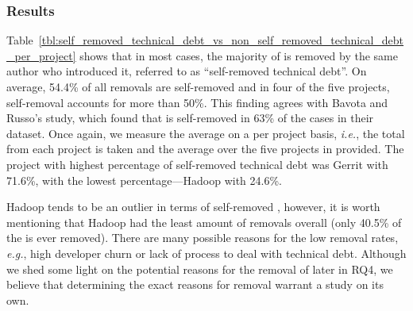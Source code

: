 \subsubsection*{Results} Table~\ref{tbl:self_removed_technical_debt_vs_non_self_removed_technical_debt_per_project} shows that in most cases, the majority of \SATD is removed by the same author who introduced it, referred to as ``self-removed technical debt''. On average, 54.4\% of all removals are self-removed and in four of the five projects, self-removal accounts for more than 50\%.  This finding agrees with Bavota and Russo's study, which found that \SATD is self-removed in 63\% of the cases in their dataset. Once again, we measure the average on a per project basis, \emph{i.e.}, the total from each project is taken and the average over the five projects in provided. The project with highest percentage of self-removed technical debt was Gerrit with 71.6\%, with the lowest percentage---Hadoop with 24.6\%. %

Hadoop tends to be an outlier in terms of self-removed \SATD, however, it is worth mentioning that Hadoop had the least amount of removals overall (only 40.5\% of the \SATD is ever removed). There are many possible reasons for the low removal rates, \emph{e.g.}, high developer churn or lack of process to deal with technical debt. Although we shed some light on the potential reasons for the removal of \SATD later in RQ4, we believe that determining the exact reasons for \SATD removal warrant a study on its own.







\subsection*{\rqiii}


